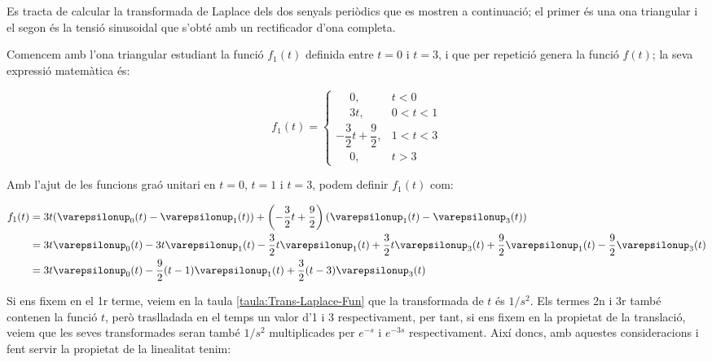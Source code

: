 	
\begin{exemple}[\CalcTransfLaplace{}]
	\addcontentsxms{\CalcTransfLaplace}
    Es tracta de calcular la transformada de Laplace dels dos
    senyals periòdics que es mostren a continuació; el primer és una
    ona triangular i el segon és la tensió sinusoidal que s'obté amb un
    rectificador d'ona completa.

    \begin{center}
        
    \end{center}

    Comencem amb l'ona triangular estudiant la funció $f_1(t)$ definida
    entre $t=0$ i $t=3$, i que per repetició genera la funció $f(t)$; la
    seva expressió matemàtica és:

    \[
        f_1(t) = \begin{cases}
        \phantom{-}0, & t < 0\\
        \phantom{-}3t, & 0<t<1 \\
        -\dfrac{3}{2}t +\dfrac{9}{2}, & 1 < t < 3 \\
        \phantom{-}0, & t > 3 \end{cases}
    \]

    Amb l'ajut de les funcions graó unitari en $t=0$, $t=1$ i $t=3$,
    podem definir $f_1(t)$ com:

    \[\begin{split}
        f_1(t) &= 3t (\varepsilonup_0(t) - \varepsilonup_1(t)) + \left(-\frac{3}{2}t
        +\frac{9}{2}\right) (\varepsilonup_1(t) -
        \varepsilonup_3(t))  \\
        &=
        3t\varepsilonup_0(t)-3t\varepsilonup_1(t)-\frac{3}{2}t \varepsilonup_1(t)
        +\frac{3}{2}t \varepsilonup_3(t) +\frac{9}{2} \varepsilonup_1(t)
        -\frac{9}{2} \varepsilonup_3(t)  \\
        &=3t\varepsilonup_0(t) -\frac{9}{2}(t-1)\varepsilonup_1(t) +
        \frac{3}{2}(t-3)\varepsilonup_3(t)
    \end{split}\]

    Si ens fixem en el 1r terme, veiem en la taula
    \vref{taula:Trans-Laplace-Fun} que la  transformada de $t$ és $1/s^2$.
    Els termes 2n i 3r també contenen la funció $t$, però traslladada
    en el temps un valor d'1 i 3 respectivament, per tant, si ens fixem
    en la propietat de la translació, veiem que les seves transformades
    seran també $1/s^2$ multiplicades per $e^{-s}$ i $e^{-3s}$
    respectivament. Així doncs, amb aquestes consideracions i fent
    servir la propietat de la linealitat tenim:


\end{exemple}
